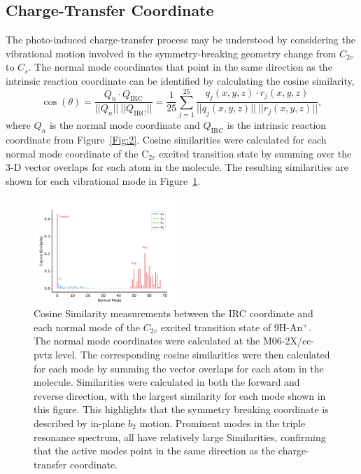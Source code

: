 \documentclass[journal=jpcafh,manuscript=article,layout=onecolumn, 12pt]{achemso}
\begin{document}
\subsection{Charge-Transfer Coordinate}
The photo-induced charge-transfer process may be understood by considering the vibrational motion involved in the symmetry-breaking geometry change from $C_{2v}$ to $C_s$. The normal mode coordinates that point in the same direction as the intrinsic reaction coordinate can be identified by calculating the cosine similarity,
\begin{equation}
	\cos(\theta) = \frac{Q_n\cdot Q_{\text{IRC}}}{||Q_n||~||Q_{\text{IRC}}||} = \frac{1}{25} \displaystyle\sum_{j=1}^{25}\frac{q_j(x,y,z)\cdot r_j(x,y,z)}{||q_j(x,y,z)||~||r_j(x,y,z)||},
\end{equation}
where $Q_n$ is the normal mode coordinate and $Q_{\text{IRC}}$ is the intrinsic reaction coordinate from Figure~\ref{Fig:2}. Cosine similarities were calculated for each normal mode coordinate of the C$_{2v}$ excited transition state by summing over the 3-D vector overlaps for each atom in the molecule. The resulting similarities are shown for each vibrational mode in Figure~\ref{Fig:5}.

\begin{figure} [h]
	\includegraphics[width=0.5\textwidth]{figures/Figure5}
	\caption{Cosine Similarity measurements between the IRC coordinate and each normal mode of the $C_{2v}$ excited transition state of 9H-An$^+$. The normal mode coordinates were calculated at the M06-2X/cc-pvtz level. The corresponding cosine similarities were then calculated for each mode by summing the vector overlaps for each atom in the molecule. Similarities were calculated in both the forward and reverse direction, with the largest similarity for each mode shown in this figure. This highlights that the symmetry breaking coordinate is described by in-plane $b_2$ motion. Prominent modes in the triple resonance spectrum, all have relatively large Similarities, confirming that the active modes point in the same direction as the charge-transfer coordinate.}
	\label{Fig:5}
\end{figure}
\end{document}
